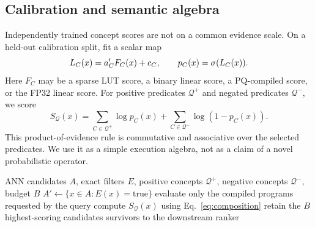 \subsection{Calibration and semantic algebra}
Independently trained concept scores are not on a common evidence scale. On a held-out calibration split, fit a scalar map
\begin{equation}
L_C(x)=a_C'F_C(x)+c_C,\qquad p_C(x)=\sigma(L_C(x)).
\end{equation}
Here $F_C$ may be a sparse LUT score, a binary linear score, a PQ-compiled score, or the FP32 linear score. For positive predicates $\mathcal{Q}^+$ and negated predicates $\mathcal{Q}^-$, we score
\begin{equation}
S_{\mathcal{Q}}(x)=
\sum_{C\in\mathcal{Q}^+}\log p_C(x)
+\sum_{C\in\mathcal{Q}^-}\log(1-p_C(x)).
\label{eq:composition}
\end{equation}
This product-of-evidence rule is commutative and associative over the selected predicates. We use it as a simple execution algebra, not as a claim of a novel probabilistic operator.

\begin{algorithm}[t]
\caption{Execute a semantic query plan}
\label{alg:execute}
\begin{algorithmic}[1]
\Require ANN candidates $A$, exact filters $E$, positive concepts $\mathcal{Q}^+$, negative concepts $\mathcal{Q}^-$, budget $B$
\State $A'\gets\{x\in A:E(x)=\mathrm{true}\}$
  \State evaluate only the compiled programs requested by the query
  \State compute $S_{\mathcal{Q}}(x)$ using Eq.~\eqref{eq:composition}
\EndFor
\State retain the $B$ highest-scoring candidates
\State \Return survivors to the downstream ranker
\end{algorithmic}
\end{algorithm}
